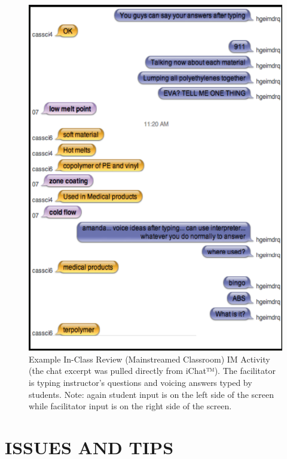 \documentclass[11.5pt]{sig-alternate} %
\begin{document}
\begin{large}
\begin{figure}[!h]
    \centering
    \includegraphics[width=1\linewidth]{images/fig7.png}
    \caption{Example In-Class Review (Mainstreamed Classroom) IM Activity (the chat excerpt was pulled directly from iChat™). The facilitator is typing instructor's questions and voicing answers typed by students. Note: again student input is on the left side of the screen while facilitator input is on the right side of the screen. }
\end{figure}

\section*{ISSUES AND TIPS}


\end{large}
\end{document}
